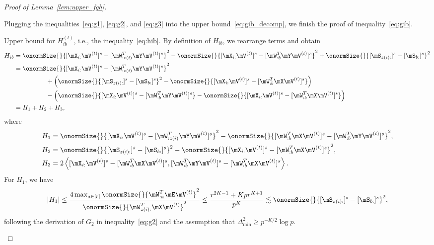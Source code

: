 \documentclass[lettersize,onecolumn,journal]{IEEEtran}
\theoremstyle{definition}
\theoremstyle{definition}
\newcommand{\of}[1]{\left(#1\right)}
\newcommand{\ang}[1]{\left\langle#1\right\rangle}
\begin{document}
\begin{proof}[Proof of Lemma~\ref{lem:upper_fgh}]
\begin{enumerate}[wide]
{    Plugging the inequalities~\eqref{eq:g1}, \eqref{eq:g2}, and \eqref{eq:g3} into the upper bound~\eqref{eq:gib_decomp}, we finish the proof of inequality~\eqref{eq:gib}.    
    \item Upper bound for $H_{ib}^{(t)}$, i.e., the inequality~\eqref{eq:hib}. By definition of $H_{ib}$, we rearrange terms and obtain
    \begin{align}
        H_{ib} &= \onormSize{}{ [\mX_{i:} \mV^{(t)}]^s -  [  \mW_{:z(i)}^T \mY \mV^{(t)} ]^s}^2 - \onormSize{}{ [\mX_{i:} \mV^{(t)}]^s -  [  \mW_{:b}^T \mY \mV^{(t)} ]^s}^2 + \onormSize{}{ [ \mS_{z(i):}  ]^s - [ \mS_{b:}  ]^s  }^2 \\
        & =  \onormSize{}{ [ \mX_{i:} \mV^{(t)}]^s -  [  \mW_{:z(i)}^T \mY \mV^{(t)} ]^s}^2 \\
        & \quad \quad \quad \quad \quad + \of{ \onormSize{}{ [ \mS_{z(i):}  ]^s - [ \mS_{b:}  ]^s  }^2 - \onormSize{}{ [\mX_{i:} \mV^{(t)}]^s-  [  \mW_{:b}^T \mX \mV^{(t)} ]^s }  } \\
        & \quad \quad \quad \quad \quad  - \of{\onormSize{}{ [\mX_{i:} \mV^{(t)}]^s-  [  \mW_{:b}^T \mY \mV^{(t)} ]^s } -  \onormSize{}{ [\mX_{i:} \mV^{(t)}]^s-  [  \mW_{:b}^T \mX \mV^{(t)} ]^s }   } \\
        & = H_1 + H_2 + H_3,
    \end{align}
    where 
    \begin{align}
        H_1 &= \onormSize{}{ [ \mX_{i:} \mV^{(t)}]^s -  [  \mW_{:z(i)}^T \mY \mV^{(t)} ]^s}^2 - \onormSize{}{ [ \mW_{:b}^T \mX \mV^{(t)}]^s -  [ \mW_{:b}^T \mY \mV^{(t)}]^s}^2, \\
        H_2 &=  \onormSize{}{ [ \mS_{z(i):}  ]^s - [ \mS_{b:}  ]^s  }^2 - \onormSize{}{ [\mX_{i:} \mV^{(t)}]^s-  [  \mW_{:b}^T \mX \mV^{(t)} ]^s }^2  , \\
        H_3 & = 2 \ang{  [\mX_{i:} \mV^{(t)}]^s  -  [  \mW_{:b}^T \mX \mV^{(t)} ]^s,  [  \mW_{:b}^T \mY \mV^{(t)} ]^s -  [  \mW_{:b}^T \mX \mV^{(t)} ]^s }.
    \end{align}
    For $H_1$, we have 
    \begin{align}
        |H_1| \leq  \frac{4 \max_{a \in [r]}\onormSize{}{ \mW_{:a}^T \mE \mV^{(t)} }^2 }{ \onormSize{}{ \mW_{z(i):}^T\mX \mV^{(t)}}^2}
         \leq  \frac{ r^{2K-1} + K p r^{K+1} }{p^{K}} 
        \lesssim  \onormSize{}{ [ \mS_{z(i):}  ]^s - [ \mS_{b:}  ]^s  }^2\label{eq:h1},
    \end{align}
    following the derivation of $G_2$ in inequality~\eqref{eq:g2} and the assumption that $\Delta_{\min}^2 \geq p^{-K/2} \log p$.

}
\end{enumerate}
\end{proof}
\end{document}
